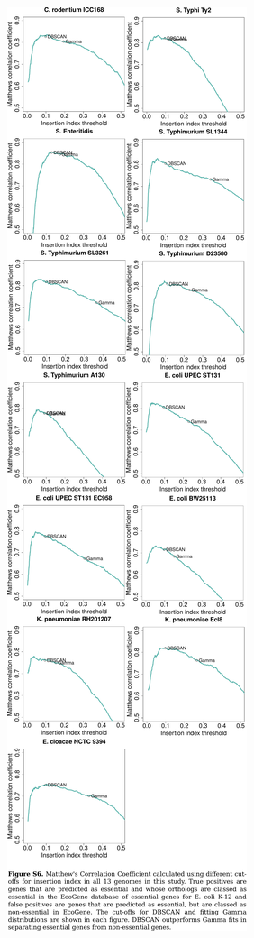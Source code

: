 \documentclass{article}
\newcommand{\Newpage}{\end{preview}\begin{preview}}
\begin{document}
\begin{preview}
\includegraphics{suppl6.pdf}
\Newpage

\end{preview}
\end{document}

